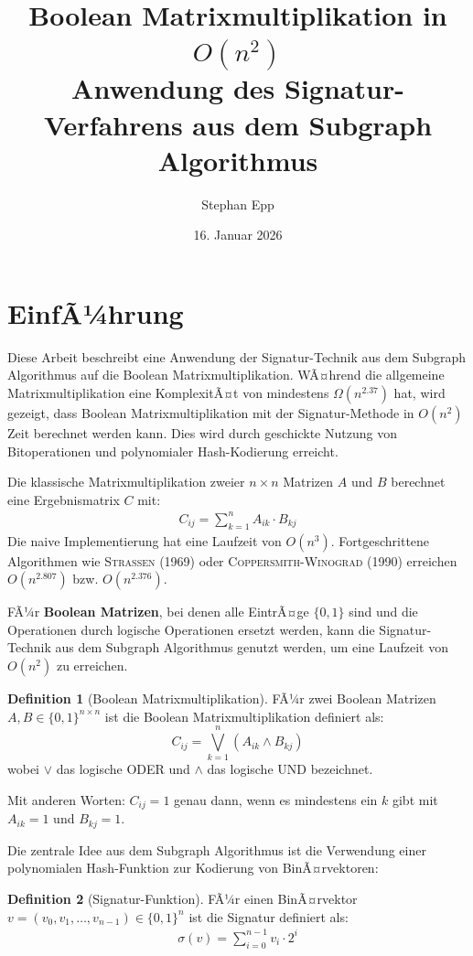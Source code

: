 ﻿\documentclass[a4paper,12pt]{article}
\title{Boolean Matrixmultiplikation in $O(n^2)$ \\
	\large Anwendung des Signatur-Verfahrens aus dem Subgraph Algorithmus}
\author{Stephan Epp}
\date{16. Januar 2026}
\theoremstyle{definition}
\newtheorem{definition}{Definition}
\begin{document}
	
\maketitle

\tableofcontents
\newpage

\section{EinfÃ¼hrung}
Diese Arbeit beschreibt eine Anwendung der Signatur-Technik aus dem Subgraph Algorithmus auf die Boolean Matrixmultiplikation. WÃ¤hrend die allgemeine Matrixmultiplikation eine KomplexitÃ¤t von mindestens $\Omega(n^{2.37})$ hat, wird gezeigt, dass Boolean Matrixmultiplikation mit der Signatur-Methode in $O(n^2)$ Zeit berechnet werden kann. Dies wird durch geschickte Nutzung von Bitoperationen und polynomialer Hash-Kodierung erreicht.

Die klassische Matrixmultiplikation zweier $n \times n$ Matrizen $A$ und $B$ berechnet eine Ergebnismatrix $C$ mit:
\begin{align}
	C_{ij} = \sum_{k=1}^{n} A_{ik} \cdot B_{kj}
\end{align}
Die naive Implementierung hat eine Laufzeit von $O(n^3)$. Fortgeschrittene Algorithmen wie \textsc{Strassen} (1969) oder \textsc{Coppersmith-Winograd} (1990) erreichen $O(n^{2.807})$ bzw. $O(n^{2.376})$.

FÃ¼r \textbf{Boolean Matrizen}, bei denen alle EintrÃ¤ge $\{0, 1\}$ sind und die Operationen durch logische Operationen ersetzt werden, kann die Signatur-Technik aus dem Subgraph Algorithmus genutzt werden, um eine Laufzeit von $O(n^2)$ zu erreichen.

\begin{definition}[Boolean Matrixmultiplikation]
	FÃ¼r zwei Boolean Matrizen $A, B \in \{0,1\}^{n \times n}$ ist die Boolean Matrixmultiplikation definiert als:
	\[
	C_{ij} = \bigvee_{k=1}^{n} (A_{ik} \wedge B_{kj})
	\]
	wobei $\vee$ das logische ODER und $\wedge$ das logische UND bezeichnet.
\end{definition}

Mit anderen Worten: $C_{ij} = 1$ genau dann, wenn es mindestens ein $k$ gibt mit $A_{ik} = 1$ und $B_{kj} = 1$.

Die zentrale Idee aus dem Subgraph Algorithmus ist die Verwendung einer polynomialen Hash-Funktion zur Kodierung von BinÃ¤rvektoren:

\begin{definition}[Signatur-Funktion]
	FÃ¼r einen BinÃ¤rvektor $v = (v_0, v_1, \ldots, v_{n-1}) \in \{0,1\}^n$ ist die Signatur definiert als:
	\begin{align}
		\sigma(v) = \sum_{i=0}^{n-1} v_i \cdot 2^i
	\end{align}
\end{definition}
\end{document}
